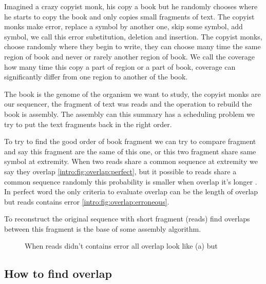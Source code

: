 \documentclass[main.tex]{subfiles}
\begin{document}
Imagined a crazy copyist monk, his copy a book but he randomly chooses where he starts to copy the book and only copies small fragments of text.
The copyist monks make error, replace a symbol by another one,  skip some symbol, add symbol, we call this error substitution, deletion and insertion.
The copyist monks, choose randomly where they begin to write, they can choose many time the same region of book and never or rarely another region of book. We call the coverage how many time this copy a part of region or a part of book, coverage can significantly differ from one region to another of the book.

The book is the genome of the organism we want to study, the copyist monks are our sequencer, the fragment of text was reads and the operation to rebuild the book is assembly. The assembly can this summary has a scheduling problem we try to put the text fragments back in the right order.

To try to find the good order of book fragment we can try to compare fragment and say this fragment are the same of this one, or this two fragment share same symbol at extremity. When two reads share a common sequence at extremity we say they overlap \ref{intro:fig:overlap:perfect}, but it possible to reads share a common sequence randomly this probability is smaller when overlap it's longer . In perfect word the only criteria to evaluate overlap can be the length of overlap but reads contains error \ref{intro:fig:overlap:erroneous}.

To reconstruct the original sequence with short fragment (reads) find overlaps between this fragment is the base of some assembly algorithm.

\begin{figure}[ht]
    \centering
    \caption{When reads didn't contains error all overlap look like (a) but}
    \label{intro:fig:overlap}
\end{figure}

\subsection{How to find overlap}
\end{document}

